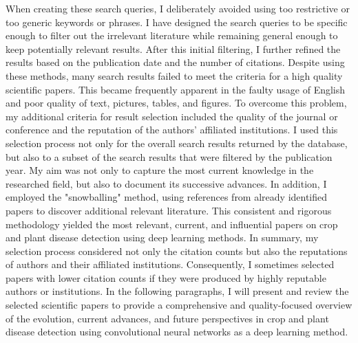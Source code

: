 \documentclass{BachelorBUI}
\begin{document}
When creating these search queries, I deliberately avoided using too restrictive or too generic keywords or phrases. I have designed the search queries to be specific enough to filter out the irrelevant literature while remaining general enough to keep potentially relevant results. After this initial filtering, I further refined the results based on the publication date and the number of citations. Despite using these methods, many search results failed to meet the criteria for a high quality scientific papers. This became frequently apparent in the faulty usage of English and poor quality of text, pictures, tables, and figures. To overcome this problem, my additional criteria for result selection included the quality of the journal or conference and the reputation of the authors' affiliated institutions. I used this selection process not only for the overall search results returned by the database, but also to a subset of the search results that were filtered by the publication year. My aim was not only to capture the most current knowledge in the researched field, but also to document its successive advances. In addition, I employed the "snowballing" method, using references from already identified papers to discover additional relevant literature. This consistent and rigorous methodology yielded the most relevant, current, and influential papers on crop and plant disease detection using deep learning methods. In summary, my selection process considered not only the citation counts but also the reputations of authors and their affiliated institutions. Consequently, I sometimes selected papers with lower citation counts if they were produced by highly reputable authors or institutions. In the following paragraphs, I will present and review the selected scientific papers to provide a comprehensive and quality-focused overview of the evolution, current advances, and future perspectives in crop and plant disease detection using convolutional neural networks as a deep learning method.
\end{document}

